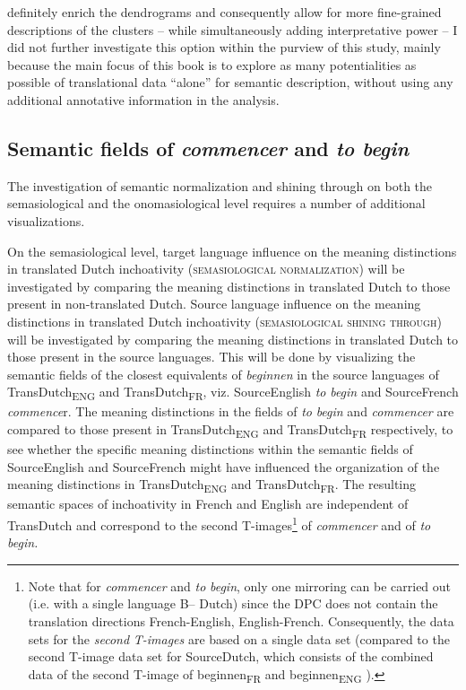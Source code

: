 definitely enrich the dendrograms and consequently allow for more fine-grained descriptions of the clusters – while simultaneously adding interpretative power – I did not further investigate this option within the purview of this study, mainly because the main focus of this book is to explore as many potentialities as possible of translational data ``alone'' for semantic description, without using any additional annotative information in the analysis.

\subsection{Semantic fields of \textit{commencer} and \textit{to begin}}
\label{sec:3.8.2}  
The investigation of semantic normalization and shining through on both the semasiological and the onomasiological level requires a number of additional visualizations.

On the semasiological level, target language influence on the meaning distinctions in translated Dutch inchoativity (\textsc{semasiological normalization}) will be investigated by comparing the meaning distinctions in translated Dutch to those present in non-translated Dutch. Source language influence on the meaning distinctions in translated Dutch inchoativity (\textsc{semasiological shining through}) will be investigated by comparing the meaning distinctions in translated Dutch to those present in the source languages. This will be done by visualizing the semantic fields of the closest equivalents of \textit{beginnen} in the source languages of TransDutch\textsubscript{ENG} and TransDutch\textsubscript{FR}, viz. SourceEnglish \textit{to} \textit{begin} and SourceFrench \textit{commence}r. The meaning distinctions in the fields of \textit{to} \textit{begin} and \textit{commencer} are compared to those present in TransDutch\textsubscript{ENG} and TransDutch\textsubscript{FR} respectively, to see whether the specific meaning distinctions within the semantic fields of SourceEnglish and SourceFrench might have influenced the organization of the meaning distinctions in TransDutch\textsubscript{ENG} and TransDutch\textsubscript{FR}. The resulting semantic spaces of inchoativity in French and English are independent of TransDutch and correspond to the second T-images\footnote{Note that for \textit{commencer} and \textit{to} \textit{begin}, only one mirroring can be carried out (i.e. with a single language B– Dutch) since the DPC does not contain the translation directions French-English, English-French. Consequently, the data sets for the \textit{second} \textit{T-images} are based on a single data set (compared to the second T-image data set for SourceDutch, which consists of the combined data of the second T-image of beginnen\textsubscript{FR} and beginnen\textsubscript{ENG} ).} of \textit{commencer} and of \textit{to} \textit{begin.}

